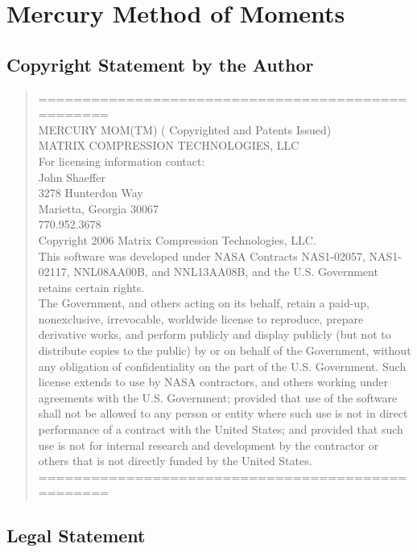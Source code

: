 % 

\section{Mercury Method of Moments}

\subsection{Copyright Statement by the Author}
\begin{quotation}
{\footnotesize{
\noindent
==================================================\\
    MERCURY MOM(TM) ( Copyrighted and Patents Issued) \\
	MATRIX COMPRESSION TECHNOLOGIES, LLC \\[10pt]
	For licensing information contact: \\
	John Shaeffer\\
	3278 Hunterdon Way\\
	Marietta, Georgia 30067\\
	770.952.3678 \\	
	Copyright 2006 Matrix Compression Technologies, LLC.\\	[10pt]
	This software was developed under NASA Contracts NAS1-02057, NAS1-02117, 
	NNL08AA00B, and NNL13AA08B, and the U.S. Government retains certain rights.\\[10pt]
	The Government, and others acting on its behalf, retain a paid-up, 
	nonexclusive, irrevocable, worldwide license to reproduce, prepare 
	derivative works, and perform publicly and display publicly (but not to 
	distribute copies to the public) by or on behalf of the Government, without
	any obligation of confidentiality on the part of the U.S. Government. Such
	license extends to use by NASA contractors, and others working under 
	agreements with the U.S. Government; provided that use of the software shall
	not be allowed to any person or entity where such use is not in direct 
	performance of a contract with the United States; and provided that such use
	is not for internal research and development by the contractor or others 
	that is not directly funded by the United States.
==================================================
}}
\end{quotation}

\subsection{Legal Statement}


